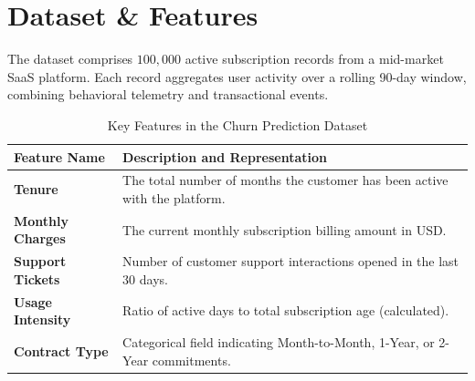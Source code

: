 \section{Dataset \& Features}
The dataset comprises $100,000$ active subscription records from a mid-market SaaS platform. Each record aggregates user activity over a rolling 90-day window, combining behavioral telemetry and transactional events.

\begin{table}[h]
\centering
\begingroup
\setlength{\parindent}{0pt}
\setlength{\parskip}{0pt}
\caption{Key Features in the Churn Prediction Dataset}
\label{tab:features}
\vspace{0.5em}
\begin{tabularx}{\linewidth}{@{}>{\color{accentdark}\bfseries}l @{\hspace{8mm}} >{\raggedright\arraybackslash}X@{}}
\toprule
Feature Name & Description and Representation \\
\midrule
Tenure & The total number of months the customer has been active with the platform. \\
Monthly Charges & The current monthly subscription billing amount in USD. \\
Support Tickets & Number of customer support interactions opened in the last 30 days. \\
Usage Intensity & Ratio of active days to total subscription age (calculated). \\
Contract Type & Categorical field indicating Month-to-Month, 1-Year, or 2-Year commitments. \\
\bottomrule
\end{tabularx}
\endgroup
\end{table}
